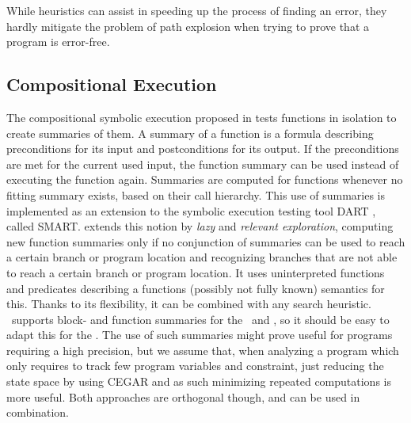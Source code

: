 While heuristics can assist in speeding up the process of finding an error, they hardly mitigate the problem of path explosion when trying to prove that a program is error-free.
\subsection*{Compositional Execution}
The compositional symbolic execution proposed in \cite{Godefroid2007} tests functions in isolation to create summaries of them.
A summary of a function is a formula describing preconditions for its input and postconditions for its output.
If the preconditions are met for the current used input, the function summary can be used instead of executing the function again.
Summaries are computed for functions whenever no fitting summary exists, based on their call hierarchy.
This use of summaries is implemented as an extension to the symbolic execution testing tool DART \cite{Godefroid2005}, called SMART.
\cite{Anand2008} extends this notion by \emph{lazy} and \emph{relevant exploration}, computing new function summaries only if no conjunction of summaries can be used to reach a certain branch or program location and
recognizing branches that are not able to reach a certain branch or program location.
It uses uninterpreted functions and predicates describing a functions (possibly not fully known) semantics for this.
Thanks to its flexibility, it can be combined with any search heuristic.
\CpaChecker\ supports block- and function summaries for the \predicateCPA\ and , so it should be easy to adapt this for the \symbolicExecutionCPA.
The use of such summaries might prove useful for programs requiring a high precision, but we assume that, when analyzing a program which only requires to track few program variables and constraint, just reducing the state space by using CEGAR and as such minimizing repeated computations is more useful.
Both approaches are orthogonal though, and can be used in combination.

